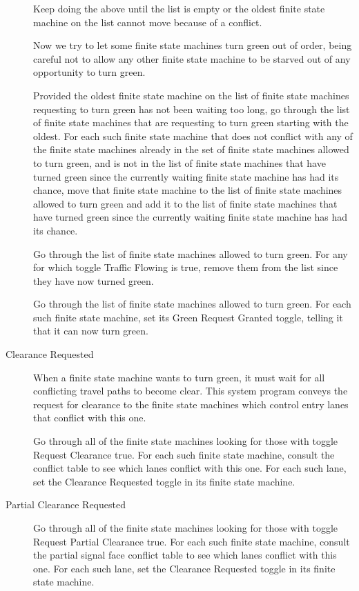 \documentclass[letterpaper,twoside]{article}
\begin{document}
\begin{description}
  Keep doing the above until the list is empty or the oldest finite
  state machine on the list cannot move because of a conflict.

  Now we try to let some finite state machines turn green out of order, being
  careful not to allow any other finite state machine to be starved out of any
  opportunity to turn green.

  Provided the oldest finite state machine on the list of finite state
  machines requesting to turn green has not been waiting too long,
  go through the list of finite state machines that are requesting
  to turn green starting with the oldest.
  For each such finite state machine that does not
  conflict with any of the finite state machines already in the set of
  finite state machines allowed to turn green, and is not in the list of
  finite state machines that have turned green since the currently waiting
  finite state machine has had its chance, move that finite state machine
  to the list of finite state machines allowed to turn green and add it to
  the list of finite state machines that have
  turned green since the currently waiting finite state machine has had its
  chance.

  Go through the list of finite state machines allowed to turn green.  For any
  for which toggle Traffic Flowing is true, remove them from the list
  since they have now turned green.

  Go through the list of finite state machines allowed to turn green.  For each
  such finite state machine, set its Green Request Granted toggle, telling it
  that it can now turn green.

\item[Clearance Requested]

  When a finite state machine wants to turn green,
  it must wait for all conflicting
  travel paths to become clear.  This system program conveys the request
  for clearance to the finite state machines which control entry lanes
  that conflict with this one.

  Go through all of the finite state machines looking for those with toggle
  Request Clearance true.  For each such finite state machine,
  consult the conflict table to see which lanes conflict with this one.
  For each such lane, set the Clearance Requested toggle in its finite
  state machine.

\item[Partial Clearance Requested]

  Go through all of the finite state machines looking for those with toggle
  Request Partial Clearance true.  For each such finite state machine,
  consult the partial signal face conflict table to see which lanes conflict
  with this one.  For each such lane, set the Clearance Requested toggle
  in its finite state machine.


\end{description}
\end{document}
